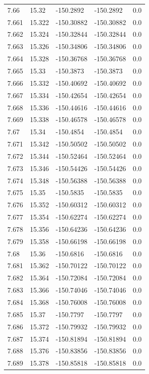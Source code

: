 \begin{tabular}{lllll}
7.66 & 15.32 & -150.2892 & -150.2892 & 0.0 \\
7.661 & 15.322 & -150.30882 & -150.30882 & 0.0 \\
7.662 & 15.324 & -150.32844 & -150.32844 & 0.0 \\
7.663 & 15.326 & -150.34806 & -150.34806 & 0.0 \\
7.664 & 15.328 & -150.36768 & -150.36768 & 0.0 \\
7.665 & 15.33 & -150.3873 & -150.3873 & 0.0 \\
7.666 & 15.332 & -150.40692 & -150.40692 & 0.0 \\
7.667 & 15.334 & -150.42654 & -150.42654 & 0.0 \\
7.668 & 15.336 & -150.44616 & -150.44616 & 0.0 \\
7.669 & 15.338 & -150.46578 & -150.46578 & 0.0 \\
7.67 & 15.34 & -150.4854 & -150.4854 & 0.0 \\
7.671 & 15.342 & -150.50502 & -150.50502 & 0.0 \\
7.672 & 15.344 & -150.52464 & -150.52464 & 0.0 \\
7.673 & 15.346 & -150.54426 & -150.54426 & 0.0 \\
7.674 & 15.348 & -150.56388 & -150.56388 & 0.0 \\
7.675 & 15.35 & -150.5835 & -150.5835 & 0.0 \\
7.676 & 15.352 & -150.60312 & -150.60312 & 0.0 \\
7.677 & 15.354 & -150.62274 & -150.62274 & 0.0 \\
7.678 & 15.356 & -150.64236 & -150.64236 & 0.0 \\
7.679 & 15.358 & -150.66198 & -150.66198 & 0.0 \\
7.68 & 15.36 & -150.6816 & -150.6816 & 0.0 \\
7.681 & 15.362 & -150.70122 & -150.70122 & 0.0 \\
7.682 & 15.364 & -150.72084 & -150.72084 & 0.0 \\
7.683 & 15.366 & -150.74046 & -150.74046 & 0.0 \\
7.684 & 15.368 & -150.76008 & -150.76008 & 0.0 \\
7.685 & 15.37 & -150.7797 & -150.7797 & 0.0 \\
7.686 & 15.372 & -150.79932 & -150.79932 & 0.0 \\
7.687 & 15.374 & -150.81894 & -150.81894 & 0.0 \\
7.688 & 15.376 & -150.83856 & -150.83856 & 0.0 \\
7.689 & 15.378 & -150.85818 & -150.85818 & 0.0 \\

\end{tabular}
